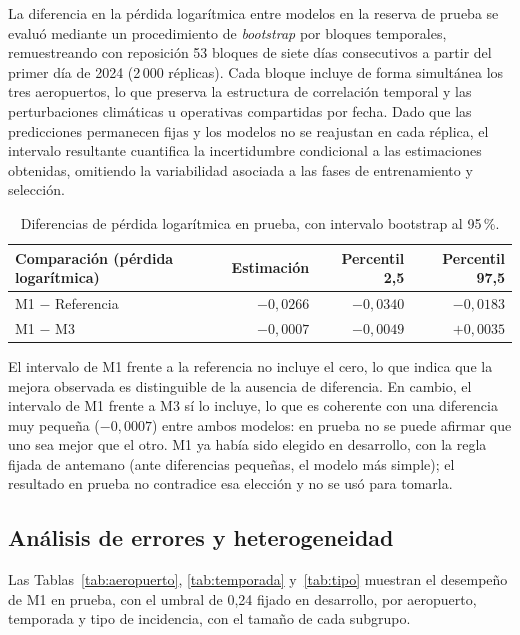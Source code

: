 \documentclass[11pt,a4paper]{article}
\begin{document}
La diferencia en la pérdida logarítmica entre modelos en la reserva de prueba se evaluó mediante un procedimiento de
\emph{bootstrap} por bloques temporales, remuestreando con reposición 53 bloques de siete días consecutivos a partir del primer
día de 2024 (2\,000 réplicas). Cada bloque incluye de forma simultánea los tres aeropuertos, lo que preserva la estructura de
correlación temporal y las perturbaciones climáticas u operativas compartidas por fecha. Dado que las predicciones permanecen fijas
y los modelos no se reajustan en cada réplica, el intervalo resultante cuantifica la incertidumbre condicional a las
estimaciones obtenidas, omitiendo la variabilidad asociada a las fases de entrenamiento y selección.
 
\begin{table}[ht]
\centering\small
\begin{tabular}{lrrr}
\toprule
Comparación (pérdida logarítmica) & Estimación & Percentil 2,5 & Percentil 97,5\\
\midrule
M1 $-$ Referencia & $-0{,}0266$ & $-0{,}0340$ & $-0{,}0183$\\
M1 $-$ M3 & $-0{,}0007$ & $-0{,}0049$ & $+0{,}0035$\\
\bottomrule
\end{tabular}
\caption{Diferencias de pérdida logarítmica en prueba, con intervalo bootstrap al 95\,\%.}
\label{tab:bootstrap}
\end{table}
 
El intervalo de M1 frente a la referencia no incluye el cero, lo que indica que la mejora observada es distinguible de la ausencia de
diferencia. En cambio, el intervalo de M1 frente a M3 sí lo incluye, lo que es coherente con una diferencia muy pequeña
($-0{,}0007$) entre ambos modelos: en prueba no se puede afirmar que uno sea mejor que el otro. M1 ya había sido elegido en
desarrollo, con la regla fijada de antemano (ante diferencias pequeñas, el modelo más simple); el resultado en prueba no contradice
esa elección y no se usó para tomarla.
 
\subsection{Análisis de errores y heterogeneidad}
 
Las Tablas~\ref{tab:aeropuerto}, \ref{tab:temporada} y~\ref{tab:tipo} muestran el desempeño de M1 en prueba, con el umbral de 0,24
fijado en desarrollo, por aeropuerto, temporada y tipo de incidencia, con el tamaño de cada subgrupo.
 
\end{document}
